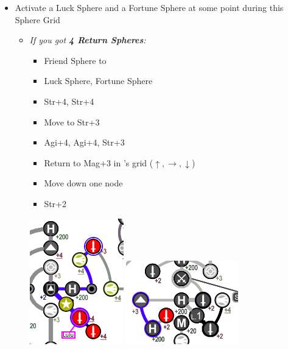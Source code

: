 \begin{spheregrid}
  \begin{multicols}{2}
    \begin{itemize}
      \item Activate a Luck Sphere and a Fortune Sphere at some point during this Sphere Grid
            \yunaf
            \begin{itemize}
              \item \textit{If you got \textbf{4 Return Spheres}:}
                    \begin{itemize}
                      \item Friend Sphere to \lulu
                      \item Luck Sphere, Fortune Sphere
                      \item Str+4, Str+4
                      \item Move to Str+3
                      \item Agi+4, Agi+4, Str+3
                      \item Return to Mag+3 in \wakka's grid ($\uparrow, \rightarrow, \downarrow$)
                      \item Move down one node
                      \item Str+2
                    \end{itemize}
                    \includegraphics[width=.5\columnwidth]{graphics/4_returns_w_luck_pt1}
                    \newline
                    \includegraphics[width=.5\columnwidth]{graphics/4_returns_w_luck_pt2}

\end{itemize}
\end{itemize}
\end{multicols}
\end{spheregrid}
